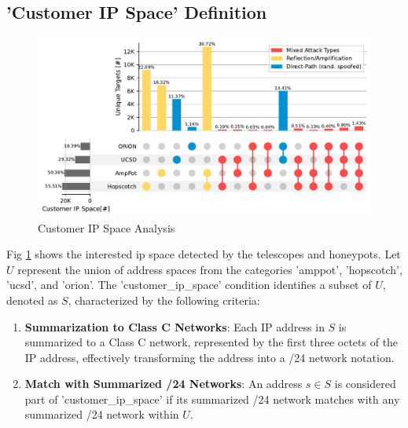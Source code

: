 \subsection*{'Customer IP Space' Definition}
\begin{figure}[htbp]
    \centering
    \includegraphics[scale=0.4]{graphs/space_no_event.pdf}
    \caption{Customer IP Space Analysis}
    \label{fig:customeripspace}
    \end{figure}
Fig \ref{fig:customeripspace} shows the interested ip space detected by the telescopes and honeypots.
Let $U$ represent the union of address spaces from the categories 'amppot', 'hopscotch', 'ucsd', and 'orion'. The 'customer\_ip\_space' condition identifies a subset of $U$, denoted as $S$, characterized by the following criteria:

\begin{enumerate}
    \item \textbf{Summarization to Class C Networks}: Each IP address in $S$ is summarized to a Class C network, represented by the first three octets of the IP address, effectively transforming the address into a /24 network notation.
    \item \textbf{Match with Summarized /24 Networks}: An address $s \in S$ is considered part of 'customer\_ip\_space' if its summarized /24 network matches with any summarized /24 network within $U$.
\end{enumerate}


